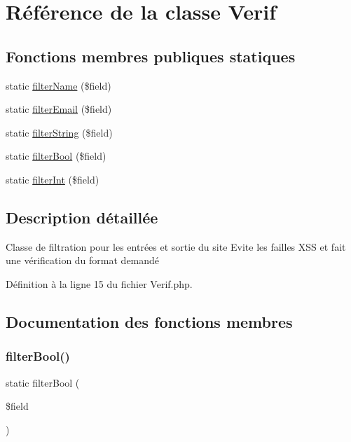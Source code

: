 \hypertarget{class_app_1_1_verif}{}\section{Référence de la classe Verif}
\label{class_app_1_1_verif}
\subsection*{Fonctions membres publiques statiques}
\begin{DoxyCompactItemize}
\item 
static \hyperlink{class_app_1_1_verif_ae66ae460929735528668ff5a64355e1c}{filter\+Name} (\$field)
\item 
static \hyperlink{class_app_1_1_verif_ad27d2a83b777170b7a7309c28b0b6976}{filter\+Email} (\$field)
\item 
static \hyperlink{class_app_1_1_verif_a99f773813353109ce02b4796ddd49467}{filter\+String} (\$field)
\item 
static \hyperlink{class_app_1_1_verif_acaebb8c6ab397efcf8d4c0e29b2b3357}{filter\+Bool} (\$field)
\item 
static \hyperlink{class_app_1_1_verif_abb832f72a01d33d452acfc2f67bc776f}{filter\+Int} (\$field)
\end{DoxyCompactItemize}


\subsection{Description détaillée}
Classe de filtration pour les entrées et sortie du site Evite les failles X\+SS et fait une vérification du format demandé 

Définition à la ligne 15 du fichier Verif.\+php.



\subsection{Documentation des fonctions membres}
\mbox{\label{class_app_1_1_verif_acaebb8c6ab397efcf8d4c0e29b2b3357}} 
\subsubsection{\texorpdfstring{filter\+Bool()}{filterBool()}}
{\footnotesize\ttfamily static filter\+Bool (\begin{DoxyParamCaption}\item[{}]{\$field }\end{DoxyParamCaption})\hspace{0.3cm}{\ttfamily [static]}}

